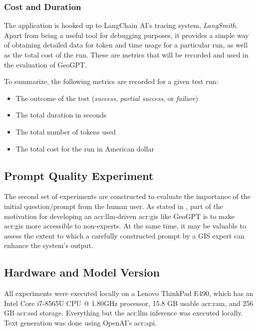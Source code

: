 \subsubsection{Cost and Duration}

The application is hooked up to LangChain AI's tracing system, \textit{LangSmith}. Apart from being a useful tool for debugging purposes, it provides a simple way of obtaining detailed data for token and time usage for a particular run, as well as the total cost of the run. These are metrics that will be recorded and used in the evaluation of GeoGPT.

To summarize, the following metrics are recorded for a given test run:

\begin{itemize}
    \item The outcome of the test (\textit{success}, \textit{partial success}, or \textit{failure})
    \item The total duration in seconds
    \item The total number of tokens used
    \item The total cost for the run in American dollar
\end{itemize}


\subsection{Prompt Quality Experiment}
\label{subsec:prompt-quality-test-setup}

The second set of experiments are constructed to evaluate the importance of the initial question/prompt from the human user. As stated in , part of the motivation for developing an \acrshort{acr:llm}-driven \acrshort{acr:gis} like GeoGPT is to make \acrshort{acr:gis} more accessible to non-experts. At the same time, it may be valuable to assess the extent to which a carefully constructed prompt by a GIS expert can enhance the system's output.


\subsection{Hardware and Model Version}
\label{subsec:hardware-and-model-version}

All experiments were executed locally on a Lenovo ThinkPad E490, which has an Intel{\textregistered} Core\texttrademark{} i7-8565U CPU @ 1.80GHz processor, 15.8 GB usable \acrshort{acr:ram}, and 256 GB \acrshort{acr:ssd} storage. Everything but the \acrshort{acr:llm} inference was executed locally. Text generation was done using OpenAI's \acrshort{acr:api}.

